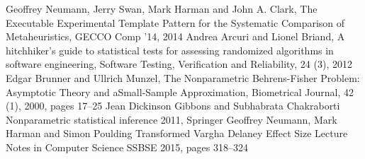 \documentclass[]{article}
\begin{document}
\begin{thebibliography}{99}
Geoffrey Neumann, Jerry Swan, Mark Harman and John A. Clark,
The Executable Experimental Template Pattern for the Systematic Comparison of Metaheuristics,
GECCO Comp '14,
2014
Andrea Arcuri and Lionel Briand,
A hitchhiker's guide to statistical tests for assessing randomized algorithms in software engineering,
Software Testing, Verification and Reliability, 24 (3),
2012
Edgar Brunner and Ullrich Munzel, 
The Nonparametric Behrens-Fisher Problem: Asymptotic Theory and aSmall-Sample Approximation, 
Biometrical Journal, 42 (1), 
2000, 
pages 17--25
Jean Dickinson Gibbons and Subhabrata Chakraborti 
Nonparametric statistical inference 
2011, 
Springer
Geoffrey Neumann, Mark Harman and Simon Poulding 
Transformed Vargha Delaney Effect Size 
Lecture Notes in Computer Science 
SSBSE 
2015, 
pages 318--324
\end{thebibliography}
\end{document}
